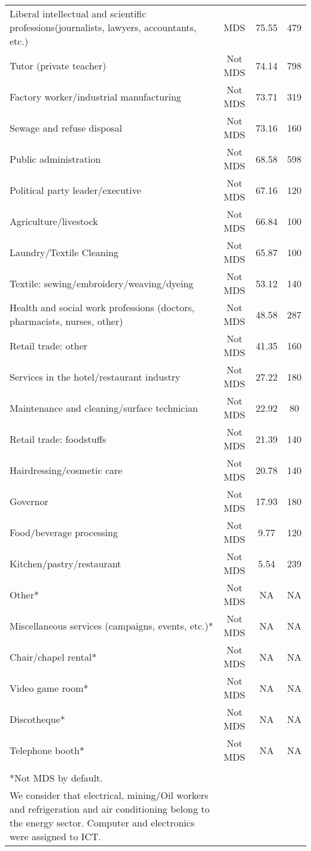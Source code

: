 {\begin{longtable}{m{9cm}ccc}
Liberal intellectual and scientific professions(journalists, lawyers, accountants, etc.)&MDS&75.55&479\\
Tutor (private teacher)&Not MDS&74.14&798\\
Factory worker/industrial manufacturing&Not MDS&73.71&319\\
Sewage and refuse disposal&Not MDS&73.16&160\\
Public administration&Not MDS&68.58&598\\
Political party leader/executive&Not MDS&67.16&120\\
Agriculture/livestock&Not MDS&66.84&100\\
Laundry/Textile Cleaning&Not MDS&65.87&100\\
Textile: sewing/embroidery/weaving/dyeing&Not MDS&53.12&140\\
Health and social work professions (doctors, pharmacists, nurses, other)&Not MDS&48.58&287\\
Retail trade: other&Not MDS&41.35&160\\
Services in the hotel/restaurant industry&Not MDS&27.22&180\\
Maintenance and cleaning/surface technician&Not MDS&22.92&80\\
Retail trade: foodstuffs&Not MDS&21.39&140\\
Hairdressing/cosmetic care&Not MDS&20.78&140\\
Governor&Not MDS&17.93&180\\
Food/beverage processing&Not MDS&9.77&120\\
Kitchen/pastry/restaurant&Not MDS&5.54&239\\
Other*&Not MDS&NA&NA\\
Miscellaneous services (campaigns, events, etc.)*&Not MDS&NA&NA\\
Chair/chapel rental*&Not MDS&NA&NA\\
Video game room*&Not MDS&NA&NA\\
Discotheque*&Not MDS&NA&NA\\
Telephone booth*&Not MDS&NA&NA\\
\midrule
\begin{minipage}{17cm}
\small{
{\textit Notes:} \\
*Not MDS   by default. \\
We consider that electrical, mining/Oil workers and refrigeration
and air conditioning belong to  the energy sector. Computer and electronics
were assigned to ICT.
}
\end{minipage} \\* \bottomrule
\end{longtable}
}
